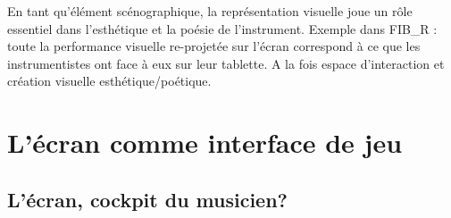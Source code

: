 \noindent En tant qu'élément scénographique, la représentation visuelle joue un rôle essentiel dans l'esthétique et la poésie de l'instrument.
Exemple dans FIB\_R : toute la performance visuelle re-projetée sur l'écran correspond à ce que les instrumentistes ont face à eux sur leur tablette. A la fois espace d'interaction et création visuelle esthétique/poétique.



\section{L'écran comme interface de jeu}

\subsection{L'écran, cockpit du musicien?}

